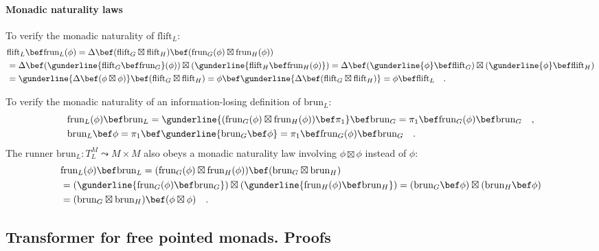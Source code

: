 \paragraph{Monadic naturality laws}

To verify the monadic naturality of $\text{flift}_{L}$:
\begin{align*}
 & \text{flift}_{L}\bef\text{frun}_{L}(\phi)=\Delta\bef(\text{flift}_{G}\boxtimes\text{flift}_{H})\bef(\text{frun}_{G}(\phi)\boxtimes\text{frun}_{H}(\phi))\\
 & =\Delta\bef(\gunderline{\text{flift}_{G}\bef\text{frun}_{G}}(\phi))\boxtimes(\gunderline{\text{flift}_{H}\bef\text{frun}_{H}(\phi)})=\Delta\bef(\gunderline{\phi}\bef\text{flift}_{G})\boxtimes(\gunderline{\phi}\bef\text{flift}_{H})\\
 & =\gunderline{\Delta\bef(\phi\boxtimes\phi)}\bef(\text{flift}_{G}\boxtimes\text{flift}_{H})=\phi\bef\gunderline{\Delta\bef(\text{flift}_{G}\boxtimes\text{flift}_{H})}=\phi\bef\text{flift}_{L}\quad.
\end{align*}

To verify the monadic naturality of an information-losing definition
of $\text{brun}_{L}$:
\begin{align*}
 & \text{frun}_{L}(\phi)\bef\text{brun}_{L}=\gunderline{(\text{frun}_{G}(\phi)\boxtimes\text{frun}_{H}(\phi))\bef\pi_{1}}\bef\text{brun}_{G}=\pi_{1}\bef\text{frun}_{G}(\phi)\bef\text{brun}_{G}\quad,\\
 & \text{brun}_{L}\bef\phi=\pi_{1}\bef\gunderline{\text{brun}_{G}\bef\phi}=\pi_{1}\bef\text{frun}_{G}(\phi)\bef\text{brun}_{G}\quad.
\end{align*}
The runner $\text{brun}_{L}:T_{L}^{M}\leadsto M\times M$ also obeys
a monadic naturality law involving $\phi\boxtimes\phi$ instead of
$\phi$:
\begin{align*}
 & \text{frun}_{L}(\phi)\bef\text{brun}_{L}=(\text{frun}_{G}(\phi)\boxtimes\text{frun}_{H}(\phi))\bef(\text{brun}_{G}\boxtimes\text{brun}_{H})\\
 & =(\gunderline{\text{frun}_{G}(\phi)\bef\text{brun}_{G}})\boxtimes(\gunderline{\text{frun}_{H}(\phi)\bef\text{brun}_{H}})=(\text{brun}_{G}\bef\phi)\boxtimes(\text{brun}_{H}\bef\phi)\\
 & =(\text{brun}_{G}\boxtimes\text{brun}_{H})\bef(\phi\boxtimes\phi)\quad.
\end{align*}


\subsection{Transformer for free pointed monads. Proofs}

